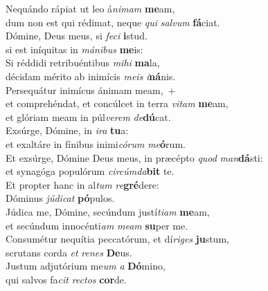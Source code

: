 \evenverse Nequándo rápiat ut leo á\textit{ni}\textit{mam} \textbf{me}am,~\*\\
\evenverse dum non est qui rédimat, neque \textit{qui} \textit{sal}\textit{vum} \textbf{fá}ciat.\\
\oddverse Dómine, Deus meus, si \textit{fe}\textit{ci} \textbf{i}stud.~\*\\
\oddverse si est iníquitas in \textit{má}\textit{ni}\textit{bus} \textbf{me}is:\\
\evenverse Si réddidi retribuéntibus \textit{mi}\textit{hi} \textbf{ma}la,~\*\\
\evenverse décidam mérito ab inimícis \textit{me}\textit{is} \textit{i}\textbf{ná}nis.\\
\oddverse Persequátur inimícus ánimam meam,~+\\
\oddverse  et comprehéndat, et concúlcet in terra \textit{vi}\textit{tam} \textbf{me}am,~\*\\
\oddverse et glóriam meam in púl\textit{ve}\textit{rem} \textit{de}\textbf{dú}cat.\\
\evenverse Exsúrge, Dómine, in \textit{i}\textit{ra} \textbf{tu}a:~\*\\
\evenverse et exaltáre in fínibus inimi\textit{có}\textit{rum} \textit{me}\textbf{ó}rum.\\
\oddverse Et exsúrge, Dómine Deus meus, in præcépto \textit{quod} \textit{man}\textbf{dá}sti:~\*\\
\oddverse et synagóga populórum \textit{cir}\textit{cúm}\textit{da}\textbf{bit} te.\\
\evenverse Et propter hanc in al\textit{tum} \textit{re}\textbf{gré}dere:~\*\\
\evenverse Dóminus \textit{jú}\textit{di}\textit{cat} \textbf{pó}pulos.\\
\oddverse Júdica me, Dómine, secúndum justí\textit{ti}\textit{am} \textbf{me}am,~\*\\
\oddverse et secúndum innocénti\textit{am} \textit{me}\textit{am} \textbf{su}per me.\\
\evenverse Consumétur nequítia peccatórum, et dí\textit{ri}\textit{ges} \textbf{ju}stum,~\*\\
\evenverse scrutans corda \textit{et} \textit{re}\textit{nes} \textbf{De}us.\\
\oddverse Justum adjutórium me\textit{um} \textit{a} \textbf{Dó}mino,~\*\\
\oddverse qui salvos fa\textit{cit} \textit{re}\textit{ctos} \textbf{cor}de.\\
